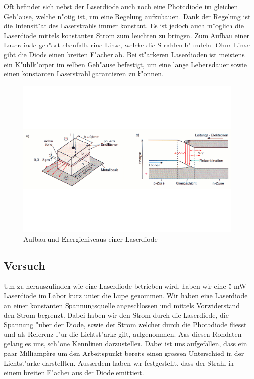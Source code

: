 \begin{refsection}
Oft befindet sich nebst der Laserdiode auch noch eine Photodiode im gleichen 
Geh"ause, welche n"otig ist, um eine Regelung aufzubauen. Dank der Regelung 
ist die Intensit"at des Laserstrahls immer konstant. Es ist jedoch auch 
m"oglich die Laserdiode mittels konstanten Strom zum leuchten zu bringen. Zum 
Aufbau einer Laserdiode geh"ort ebenfalls eine Linse, welche die Strahlen 
b"undeln. Ohne Linse gibt die Diode einen breiten F"acher ab. Bei st"arkeren 
Laserdioden ist meistens ein K"uhlk"orper im selben Geh"ause befestigt, um 
eine lange Lebensdauer sowie einen konstanten Laserstrahl garantieren zu 
k"onnen. 
\begin{figure}
\centering
\includegraphics[scale=0.35]{laser/bilder/laserdiodeb.pdf}
\caption{Aufbau und Energieniveaus einer Laserdiode \cite{halbleiterlaser}}
\label{fig:Laserdiode}
\end{figure}

\subsection{Versuch}
Um zu herauszufinden wie eine Laserdiode betrieben wird, haben wir eine 5 mW Laserdiode im Labor kurz 
unter die Lupe genommen. Wir haben eine Laserdiode an einer konstanten 
Spannungsquelle angeschlossen und mittels Vorwiderstand den Strom 
begrenzt. Dabei haben wir den Strom durch die Laserdiode, die Spannung "uber 
der Diode, sowie der Strom welcher durch die Photodiode fliesst und als 
Referenz f"ur die Lichtst"arke gilt, aufgenommen. Aus diesen Rohdaten gelang 
es uns, sch"one Kennlinen darzustellen. Dabei ist uns aufgefallen, dass ein 
paar Milliamp\`{e}re um den Arbeitspunkt bereits einen grossen Unterschied in
der Lichtst"arke darstellten. Ausserdem haben wir festgestellt,
dass der Strahl in einem breiten F"acher aus der Diode emittiert.


\end{refsection}
